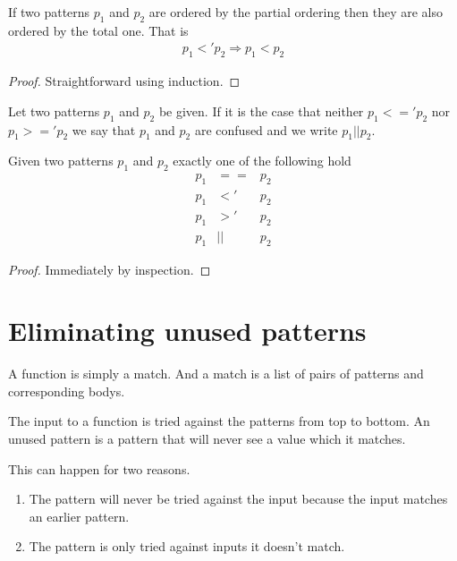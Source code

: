 \begin{lemma}[]\label{lem:total-implies-partial}
  If two patterns $p_1$ and $p_2$ are ordered by the partial ordering then they
  are also ordered by the total one. That is
  \begin{eqnarray*}
    p_1 <' p_2 \Longrightarrow p_1 < p_2
  \end{eqnarray*}
\end{lemma}
\begin{proof}
  Straightforward using induction.
\end{proof}

\begin{definition}[Confusion, $||$]\label{def:pat-confusion}
  Let two patterns $p_1$ and $p_2$ be given. If it is the case that neither $p_1
  <=' p_2$ nor $p_1 >=' p_2$ we say that $p_1$ and $p_2$ are confused and we
  write $p_1 || p_2$.
\end{definition}

\begin{lemma}\label{lem:unique-rel}
  Given two patterns $p_1$ and $p_2$ exactly one of the following hold
  \begin{eqnarray*}
    p_1 &==& p_2\\
    p_1 &<'& p_2\\
    p_1 &>'& p_2\\
    p_1 &||& p_2
  \end{eqnarray*}
\end{lemma}
\begin{proof}
  Immediately by inspection.
\end{proof}

\section{Eliminating unused patterns}
A function is simply a match. And a match is a list of pairs of patterns and
corresponding bodys.

The input to a function is tried against the patterns from top to bottom. An
unused pattern is a pattern that will never see a value which it matches.

This can happen for two reasons.
\begin{enumerate}
\item The pattern will never be tried against the input because the input
  matches an earlier pattern. \label{item:unused-reason-1}
\item The pattern is only tried against inputs it doesn't match. \label{item:unused-reason-2}
\end{enumerate}

